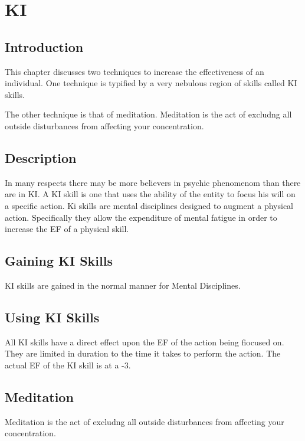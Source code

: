\chapter{KI}

\section{Introduction}

This chapter discusses two techniques to increase the effectiveness 
of an individual. One technique is typified by a  very nebulous 
region of skills called KI skills. 

The other technique is that of meditation. 
Meditation is the act of excludng all outside disturbances from 
affecting your concentration.  

\section{Description}

In many respects there may be more believers in psychic phenomenom 
than there are in KI. A KI skill is one that uses the ability of the 
entity to focus his will on a specific action. Ki skills are mental 
disciplines designed to augment a physical action. Specifically they 
allow the expenditure of mental fatigue in order to increase the EF 
of a physical skill.  

\section{Gaining KI Skills}

KI skills are gained in the normal manner for Mental Disciplines. 

\section{Using KI Skills}

All KI skills have a direct effect upon the EF of the action being 
fiocused on. They are limited in duration to the time it takes to 
perform the action. The actual EF of the KI skill is at a -3. 

\section{Meditation}

Meditation is the act of excludng all outside disturbances from 
affecting your concentration.  


